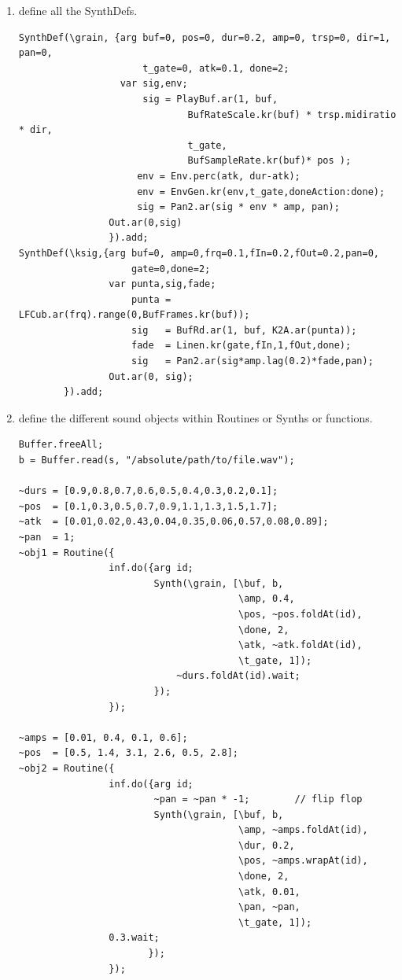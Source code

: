 \begin{enumerate}
\def\labelenumi{\arabic{enumi}.}
\tightlist

\item define all the SynthDefs.
\begin{lstlisting}[frame=single] 
SynthDef(\grain, {arg buf=0, pos=0, dur=0.2, amp=0, trsp=0, dir=1, pan=0,
	                  t_gate=0, atk=0.1, done=2;
                  var sig,env;
                      sig = PlayBuf.ar(1, buf,
                              BufRateScale.kr(buf) * trsp.midiratio * dir,
                              t_gate,
                              BufSampleRate.kr(buf)* pos );
                     env = Env.perc(atk, dur-atk);
                     env = EnvGen.kr(env,t_gate,doneAction:done);
                     sig = Pan2.ar(sig * env * amp, pan);
                Out.ar(0,sig)
                }).add;
SynthDef(\ksig,{arg buf=0, amp=0,frq=0.1,fIn=0.2,fOut=0.2,pan=0,
                    gate=0,done=2;
                var punta,sig,fade;
                    punta = LFCub.ar(frq).range(0,BufFrames.kr(buf));   
                    sig   = BufRd.ar(1, buf, K2A.ar(punta));
                    fade  = Linen.kr(gate,fIn,1,fOut,done);
                    sig   = Pan2.ar(sig*amp.lag(0.2)*fade,pan);
                Out.ar(0, sig);
        }).add;
\end{lstlisting}

\item define the different sound objects within Routines or Synths or functions.
\begin{lstlisting}[frame=single] 
Buffer.freeAll;
b = Buffer.read(s, "/absolute/path/to/file.wav");

~durs = [0.9,0.8,0.7,0.6,0.5,0.4,0.3,0.2,0.1];       
~pos  = [0.1,0.3,0.5,0.7,0.9,1.1,1.3,1.5,1.7];
~atk  = [0.01,0.02,0.43,0.04,0.35,0.06,0.57,0.08,0.89];    
~pan  = 1;  
~obj1 = Routine({
                inf.do({arg id;                              
                        Synth(\grain, [\buf, b, 
                                       \amp, 0.4, 
                                       \pos, ~pos.foldAt(id), 
                                       \done, 2, 
                                       \atk, ~atk.foldAt(id), 
                                       \t_gate, 1]);
		                    ~durs.foldAt(id).wait;                 
                        });
                });

~amps = [0.01, 0.4, 0.1, 0.6];
~pos  = [0.5, 1.4, 3.1, 2.6, 0.5, 2.8];
~obj2 = Routine({
                inf.do({arg id;             
                        ~pan = ~pan * -1;        // flip flop                 
                        Synth(\grain, [\buf, b, 
                                       \amp, ~amps.foldAt(id),
                                       \dur, 0.2, 
                                       \pos, ~amps.wrapAt(id),
                                       \done, 2, 
                                       \atk, 0.01, 
                                       \pan, ~pan,
                                       \t_gate, 1]);
		        0.3.wait;                 
                       });
                });
\end{lstlisting}


\end{enumerate}
